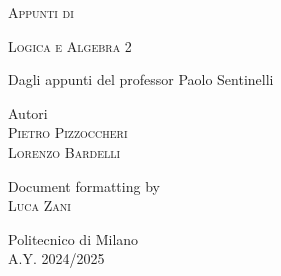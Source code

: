 \documentclass[10pt,a4paper,twoside]{book}
\begin{document}
\frontmatter

\pagestyle{empty}

\hypertarget{mytitlepage}{}

\vspace*{\fill}
\begin{center}
    {\large \textsc{Appunti di}}\\

    \vspace*{0.4cm}

    {\Huge
        \textsc{Logica e Algebra 2}}\\

    \vspace*{1cm}

    {\large Dagli appunti del professor Paolo Sentinelli}\\

    \vspace*{1cm}

    Autori\\
    \vspace*{0.1cm}
    \textsc{Pietro Pizzoccheri}\\
    \textsc{Lorenzo Bardelli}\\

    \vspace*{0.4cm}

    Document formatting by\\
    \vspace*{0.1cm}
    \textsc{Luca Zani}\\

    \vspace*{1cm}

    Politecnico di Milano\\A.Y. 2024/2025
\end{center}
\vspace*{\fill}
\clearpage

\hypertarget{mycopyright}{}

\clearpage


% 

\cleardoublepage
\pagestyle{toc}
\hypertarget{mytoc}{}
\bookmark[dest=mytoc,level=chapter]{\contentsname}
\tableofcontents
\cleardoublepage
\end{document}

